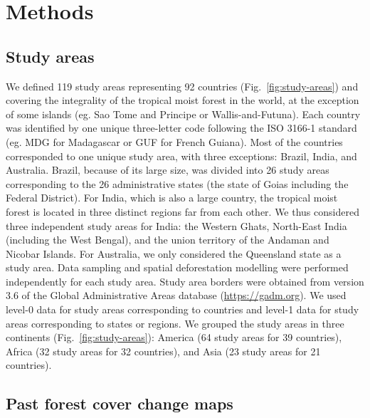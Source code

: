 \documentclass[
  12pt,
]{article}
\begin{document}
\hypertarget{materials-and-methods}{%
\section{Methods}\label{materials-and-methods}}

\hypertarget{study-areas}{%
\subsection{Study areas}\label{study-areas}}

We defined 119 study areas representing 92 countries (Fig.~\ref{fig:study-areas}) and covering the integrality of the tropical moist forest in the world, at the exception of some islands (eg. Sao Tome and Principe or Wallis-and-Futuna). Each country was identified by one unique three-letter code following the ISO 3166-1 standard (eg. MDG for Madagascar or GUF for French Guiana). Most of the countries corresponded to one unique study area, with three exceptions: Brazil, India, and Australia. Brazil, because of its large size, was divided into 26 study areas corresponding to the 26 administrative states (the state of Goias including the Federal District). For India, which is also a large country, the tropical moist forest is located in three distinct regions far from each other. We thus considered three independent study areas for India: the Western Ghats, North-East India (including the West Bengal), and the union territory of the Andaman and Nicobar Islands. For Australia, we only considered the Queensland state as a study area. Data sampling and spatial deforestation modelling were performed independently for each study area. Study area borders were obtained from version 3.6 of the Global Administrative Areas database (\url{https://gadm.org}). We used level-0 data for study areas corresponding to countries and level-1 data for study areas corresponding to states or regions. We grouped the study areas in three continents (Fig.~\ref{fig:study-areas}): America (64 study areas for 39 countries), Africa (32 study areas for 32 countries), and Asia (23 study areas for 21 countries).

\hypertarget{past-forest-cover-change-maps}{%
\subsection{Past forest cover change maps}\label{past-forest-cover-change-maps}}
\end{document}

